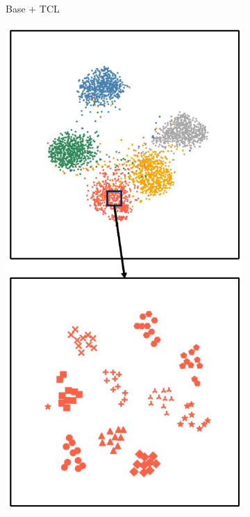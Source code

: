 \begin{figure}[h!]
\begin{subfigure}{0.24\columnwidth}
    \caption{Base + TCL}
    \label{figure3: t-SNE Base + TCL}
    \end{subfigure}
    \begin{subfigure}{0.24\columnwidth}
    \includegraphics[width=\columnwidth]{figures/MGSRCL/t-SNE/Base + CCL.pdf}

\end{subfigure}
\end{figure}
